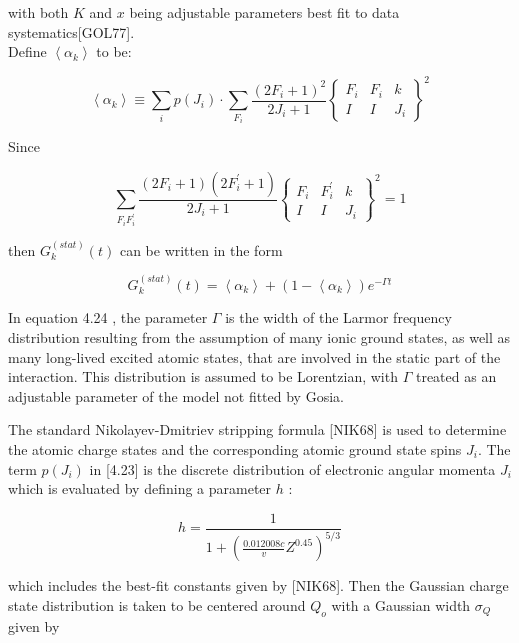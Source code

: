 \documentclass[10pt]{article}
\begin{document}
with both $K$ and $x$ being adjustable parameters best fit to data systematics[GOL77].\\
Define $\left\langle\alpha_{k}\right\rangle$ to be:

\[
\left\langle\alpha_{k}\right\rangle \equiv \sum_{i} p\left(J_{i}\right) \cdot \sum_{F_{i}} \frac{\left(2 F_{i}+1\right)^{2}}{2 J_{i}+1}\left\{\begin{array}{ccc}
F_{i} & F_{i} & k  \tag{4.23}\\
I & I & J_{i}
\end{array}\right\}^{2}
\]

Since

$$
\sum_{F_{i} F_{i}^{\prime}} \frac{\left(2 F_{i}+1\right)\left(2 F_{i}^{\prime}+1\right)}{2 J_{i}+1}\left\{\begin{array}{ccc}
F_{i} & F_{i}^{\prime} & k \\
I & I & J_{i}
\end{array}\right\}^{2}=1
$$

then $G_{k}^{(s t a t)}(t)$ can be written in the form


\begin{equation*}
G_{k}^{(s t a t)}(t)=\left\langle\alpha_{k}\right\rangle+\left(1-\left\langle\alpha_{k}\right\rangle\right) e^{-\Gamma t} \tag{4.24}
\end{equation*}


In equation 4.24 , the parameter $\Gamma$ is the width of the Larmor frequency distribution resulting from the assumption of many ionic ground states, as well as many long-lived excited atomic states, that are involved in the static part of the interaction. This distribution is assumed to be Lorentzian, with $\Gamma$ treated as an adjustable parameter of the model not fitted by Gosia.

The standard Nikolayev-Dmitriev stripping formula [NIK68] is used to determine the atomic charge states and the corresponding atomic ground state spins $J_{i}$. The term $p\left(J_{i}\right)$ in [4.23] is the discrete distribution of electronic angular momenta $J_{i}$ which is evaluated by defining a parameter $h$ :


\begin{equation*}
h=\frac{1}{1+\left(\frac{0.012008 c}{v} Z^{0.45}\right)^{5 / 3}} \tag{4.25}
\end{equation*}


which includes the best-fit constants given by [NIK68]. Then the Gaussian charge state distribution is taken to be centered around $Q_{o}$ with a Gaussian width $\sigma_{Q}$ given by
\end{document}
